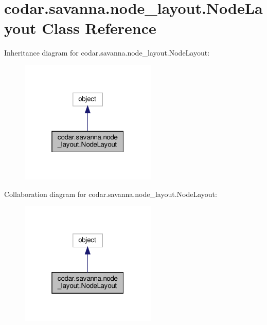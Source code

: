 \hypertarget{classcodar_1_1savanna_1_1node__layout_1_1_node_layout}{}\section{codar.\+savanna.\+node\+\_\+layout.\+Node\+Layout Class Reference}
\label{classcodar_1_1savanna_1_1node__layout_1_1_node_layout}


Inheritance diagram for codar.\+savanna.\+node\+\_\+layout.\+Node\+Layout\+:
\nopagebreak
\begin{figure}[H]
\begin{center}
\leavevmode
\includegraphics[width=184pt]{classcodar_1_1savanna_1_1node__layout_1_1_node_layout__inherit__graph}
\end{center}
\end{figure}


Collaboration diagram for codar.\+savanna.\+node\+\_\+layout.\+Node\+Layout\+:
\nopagebreak
\begin{figure}[H]
\begin{center}
\leavevmode
\includegraphics[width=184pt]{classcodar_1_1savanna_1_1node__layout_1_1_node_layout__coll__graph}
\end{center}
\end{figure}
